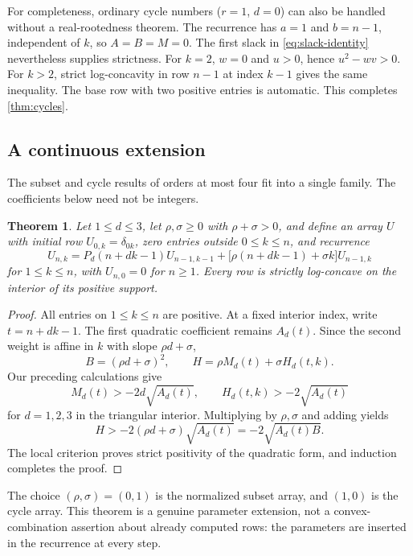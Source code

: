 \documentclass[11pt,a4paper]{article}
\numberwithin{equation}{section}
\newtheorem{theorem}{Theorem}[section]
\theoremstyle{definition}
\theoremstyle{remark}
\begin{document}
For completeness, ordinary cycle numbers ($r=1$, $d=0$) can also be
handled without a real-rootedness theorem. The recurrence has $a=1$ and
$b=n-1$, independent of $k$, so $A=B=M=0$. The first slack in
\eqref{eq:slack-identity} nevertheless supplies strictness. For $k=2$,
$w=0$ and $u>0$, hence $u^2-wv>0$. For $k>2$, strict log-concavity in
row $n-1$ at index $k-1$ gives the same inequality. The base row with two
positive entries is automatic. This completes \cref{thm:cycles}.

\subsection{A continuous extension}

The subset and cycle results of orders at most four fit into a single
family. The coefficients below need not be integers.

\begin{theorem}\label{thm:interpolation}
Let $1\le d\le3$, let $\rho,\sigma\ge0$ with $\rho+\sigma>0$, and define
an array $U$ with initial row $U_{0,k}=\delta_{0k}$, zero entries outside
$0\le k\le n$, and recurrence
\begin{equation}\label{eq:interpolating}
 U_{n,k}=P_d(n+dk-1)U_{n-1,k-1}
       +\bigl[\rho(n+dk-1)+\sigma k\bigr]U_{n-1,k}
\end{equation}
for $1\le k\le n$, with $U_{n,0}=0$ for $n\ge1$.
Every row is strictly log-concave on the interior of its positive support.
\end{theorem}
\begin{proof}
All entries on $1\le k\le n$ are positive. At a fixed interior index,
write $t=n+dk-1$. The first quadratic coefficient remains $A_d(t)$.
Since the second weight is affine in $k$ with slope $\rho d+\sigma$,
\[
 B=(\rho d+\sigma)^2,\qquad
 H=\rho M_d(t)+\sigma H_d(t,k).
\]
Our preceding calculations give
\[
 M_d(t)>-2d\sqrt{A_d(t)},\qquad
 H_d(t,k)>-2\sqrt{A_d(t)}
\]
for $d=1,2,3$ in the triangular interior. Multiplying by $\rho,\sigma$
and adding yields
\[
 H>-2(\rho d+\sigma)\sqrt{A_d(t)}=-2\sqrt{A_d(t)B}.
\]
The local criterion proves strict positivity of the quadratic form, and
induction completes the proof.
\end{proof}

The choice $(\rho,\sigma)=(0,1)$ is the normalized subset array, and
$(1,0)$ is the cycle array. This theorem is a genuine parameter extension,
not a convex-combination assertion about already computed rows: the
parameters are inserted in the recurrence at every step.
\end{document}
